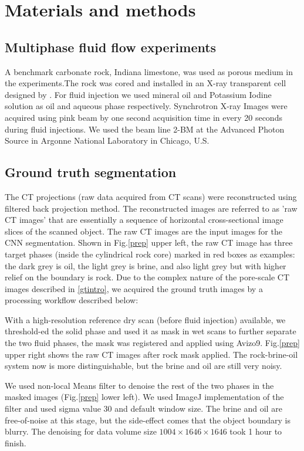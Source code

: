 \documentclass[draft,linenumbers]{agujournal2018}
\begin{document}
\section{Materials and methods}
\subsection{Multiphase fluid flow experiments}
A benchmark carbonate rock, Indiana limestone, was used as porous medium in the experiments.The rock was cored and installed in an X-ray transparent cell designed by \citet{fusseis2014low}. For fluid injection we used mineral oil and Potassium Iodine solution as oil and aqueous phase respectively. Synchrotron X-ray Images were acquired using pink beam by one second acquisition time in every 20 seconds during fluid injections. We used the beam line 2-BM at the Advanced Photon Source in Argonne National Laboratory in Chicago, U.S.

\subsection{Ground truth segmentation}\label{gtmethod}
The \textmu CT projections (raw data acquired from \textmu CT scans) were reconstructed using filtered back projection method. The reconstructed images are referred to as 'raw \textmu CT images' that are essentially a sequence of horizontal cross-sectional image slices of the scanned object. The raw \textmu CT images are the input images for the CNN segmentation. Shown in Fig.\ref{prep} upper left, the raw \textmu CT image has three target phases (inside the cylindrical rock core) marked in red boxes as examples: the dark grey is oil, the light grey is brine, and also light grey but with higher relief on the boundary is rock. Due to the complex nature of the pore-scale \textmu CT images described in \ref{gtintro}, we acquired the ground truth images by a processing workflow described below:

With a high-resolution reference dry scan (before fluid injection) available, we threshold-ed the solid phase and used it as mask in wet scans to further separate the two fluid phases, the mask was registered and applied using Avizo9\texttrademark. Fig.\ref{prep} upper right shows the raw \textmu CT images after rock mask applied. The rock-brine-oil system now is more distinguishable, but the brine and oil are still very noisy.
 
We used non-local Means \citep{buades2005non} filter to denoise the rest of the two phases in the masked images (Fig.\ref{prep} lower left). We used ImageJ implementation of the filter and used sigma value 30 and default window size. The brine and oil are free-of-noise at this stage, but the side-effect comes that the object boundary is blurry. The denoising for data volume size $1004\times1646\times1646$ took 1 hour to finish.
\end{document}
